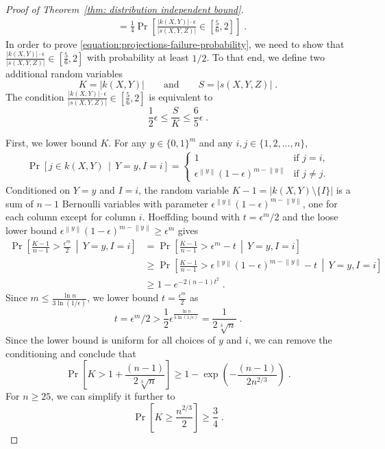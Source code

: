 \documentclass[11pt]{article}
\newcommand{\norm}[1]{\left\| #1 \right\|}
\begin{document}
\begin{proof}[Proof of Theorem~\ref{thm: distribution independent bound}]
\begin{align*}
& =
\frac{1}{4} \Pr \left[ \frac{|k(X,Y)| \cdot \epsilon}{|s(X,Y,Z)|} \in \left[\frac{5}{6}, 2 \right]  \right] \; .
\end{align*}
In order to prove \eqref{equation:projections-failure-probability}, we need to show that
$\frac{|k(X,Y)| \cdot \epsilon}{|s(X,Y,Z)|} \in \left[\frac{5}{6}, 2 \right]$ with
probability at least $1/2$. To that end, we define two additional random
variables
$$
K = |k(X,Y)| \qquad \text{and} \qquad S = |s(X,Y,Z)| \; .
$$
The condition $\frac{|k(X,Y)| \cdot \epsilon}{|s(X,Y,Z)|} \in \left[\frac{5}{6}, 2 \right]$ is equivalent to
\begin{equation}
\label{equation:ratio-condition}
\frac{1}{2} \epsilon \le \frac{S}{K} \le \frac{6}{5} \epsilon \; .
\end{equation}

First, we lower bound $K$. For any $y \in \{0,1\}^m$ and any $i,j \in \{1,2,\dots,n\}$,
\begin{align*}
\Pr \left[ j \in k(X,Y)  \, \middle| \, Y = y, I = i \right]  =
\begin{cases}
1 & \text{if $j = i$,} \\
\epsilon^{\norm{y}} (1 - \epsilon)^{m - \norm{y}} & \text{if $j \neq j$.}
\end{cases}
\end{align*}
Conditioned on $Y = y$ and $I=i$, the random variable $K - 1 = |k(X,Y) \setminus \{I\}|$ is
a sum of $n-1$ Bernoulli variables with parameter $\epsilon^{\norm{y}} (1 - \epsilon)^{m - \norm{y}}$, one for each column except for column $i$.
Hoeffding bound with $t = \epsilon^m/2$ and the loose lower bound $\epsilon^{\norm{y}} (1 - \epsilon)^{m - \norm{y}} \ge \epsilon^m$ gives
\begin{align*}
\Pr \left[ \frac{K - 1}{n - 1} > \frac{\epsilon^m}{2}  \, \middle| \,  Y = y, I = i  \right]
& = \Pr \left[ \frac{K - 1}{n - 1} > \epsilon^m - t  \, \middle| \,  Y = y, I = i  \right] \\
& \ge \Pr \left[ \frac{K - 1}{n - 1} > \epsilon^{\norm{y}} (1 - \epsilon)^{m - \norm{y}} - t  \, \middle| \,  Y = y, I = i  \right] \\
& \ge 1 - e^{-2(n-1) t^2} \; .
\end{align*}
Since $m \le \frac{\ln n}{3 \ln (1/\epsilon)}$, we lower bound $t = \frac{\epsilon^m}{2}$ as
$$
t = \epsilon^m/2 > \frac{1}{2} \epsilon^\frac{\ln n}{3 \ln(1/\epsilon)} = \frac{1}{2\sqrt[3]{n}} \; .
$$
Since the lower bound is uniform for all choices of $y$ and $i$, we can remove
the conditioning and conclude that
$$
\Pr \left[ K > 1 + \frac{(n-1)}{2\sqrt[3]{n}} \right] \ge 1 - \exp \left(- \frac{(n-1)}{2 n^{2/3}} \right) \; .
$$
For $n \ge 25$, we can simplify it further to
$$
\Pr \left[ K \ge \frac{n^{2/3}}{2} \right] \ge \frac{3}{4} \; .
$$


\end{proof}
\end{document}

